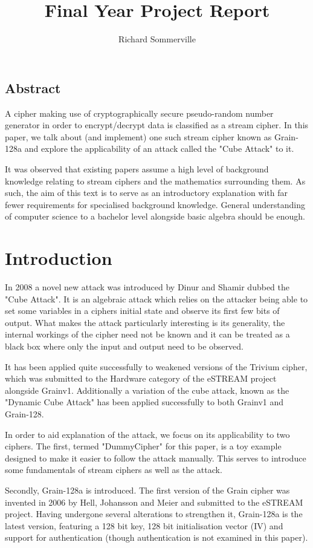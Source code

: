 \documentclass{report}
\title{Final Year Project Report}
\author{Richard Sommerville}
\date{}
\let\Oldsection\section
\renewcommand{\section}{\FloatBarrier\Oldsection}
\begin{document}
\maketitle
\tableofcontents
\section{Abstract}
A cipher making use of cryptographically secure pseudo-random number generator in order to encrypt/decrypt data is classified as a stream cipher. In this paper, we talk about (and implement) one such stream cipher known as Grain-128a and explore the applicability of an attack called the "Cube Attack" to it.

It was observed that existing papers assume a high level of background knowledge relating to stream ciphers and the mathematics surrounding them. As such, the aim of this text is to serve as an introductory explanation with far fewer requirements for specialised background knowledge. General understanding of computer science to a bachelor level alongside basic algebra should be enough.
\chapter{Introduction}
In 2008 a novel new attack was introduced by Dinur and Shamir\cite{DinurShamir2009} dubbed the "Cube Attack". It is an algebraic attack which relies on the attacker being able to set some variables in a ciphers initial state and observe its first few bits of output. What makes the attack particularly interesting is its generality, the internal workings of the cipher need not be known and it can be treated as a black box where only the input and output need to be observed.

It has been applied quite successfully to weakened versions of the Trivium cipher, which was submitted to the Hardware category of the eSTREAM project alongside Grainv1\cite{eStreamPort}. Additionally a variation of the cube attack, known as the "Dynamic Cube Attack" has been applied successfully to both Grainv1 and Grain-128.

In order to aid explanation of the attack, we focus on its applicability to two ciphers. The first, termed "DummyCipher" for this paper, is a toy example designed to make it easier to follow the attack manually. This serves to introduce some fundamentals of stream ciphers as well as the attack.

Secondly, Grain-128a is introduced. The first version of the Grain cipher was invented in 2006 by Hell, Johansson and Meier \cite{Grain128aSpec} and submitted to the eSTREAM project. Having undergone several alterations to strengthen it, Grain-128a is the latest version, featuring a 128 bit key, 128 bit initialisation vector (IV) and support for authentication (though authentication is not examined in this paper).
\end{document}
